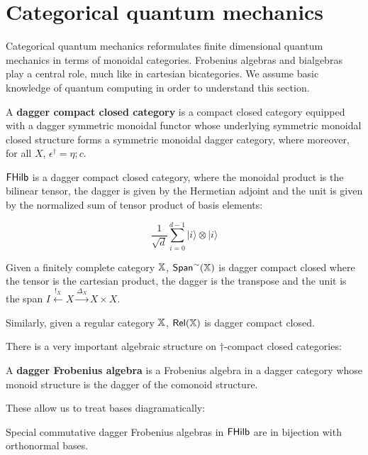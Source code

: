 \section{Categorical quantum mechanics}
Categorical quantum mechanics reformulates finite dimensional quantum mechanics in terms of monoidal categories.  Frobenius algebras and bialgebras play a central role, much like in cartesian bicategories.  We assume basic knowledge of quantum computing in order to understand this section.



\begin{definition}

A {\bf dagger compact closed category } is a compact closed category equipped with a dagger symmetric monoidal  functor whose underlying symmetric monoidal closed structure forms a symmetric monoidal dagger category, where moreover, for all $X$, $\epsilon^\dagger = \eta;c$.
\end{definition}

\begin{example}
$\mathsf{FHilb}$ is a dagger compact closed category, where the monoidal product is the bilinear tensor, the dagger is given by the Hermetian adjoint and the unit is given by the normalized sum of tensor product of basis elements:

$$
\dfrac{1}{\sqrt d}\sum_{i=0}^{d-1} |i\rangle \otimes   |i\rangle
$$
\end{example}


\begin{example}
Given a finitely complete category $\mathbb{X}$, $\mathsf{Span}^\sim (\mathbb{X})$ is dagger compact closed where the tensor is the cartesian product, the dagger is the transpose and the unit is the span $I \xleftarrow{!_X}  X \xrightarrow{\Delta_X} X \times X$.

Similarly, given a regular category $\mathbb{X}$, $\mathsf{Rel}(\mathbb{X})$ is  dagger compact closed.
\end{example}

There is a very important algebraic structure on $\dag$-compact closed categories:

\begin{definition}
\label{def:specialdagfa}
A {\bf dagger Frobenius algebra}  is a Frobenius algebra in a dagger category whose monoid structure is the dagger of the comonoid structure.

\end{definition}

These allow us to treat bases diagramatically:
\begin{lemma}
\label{lem:specialdagfa}

Special commutative dagger Frobenius algebras in $\mathsf{FHilb}$ are in bijection with orthonormal bases.
\end{lemma}

